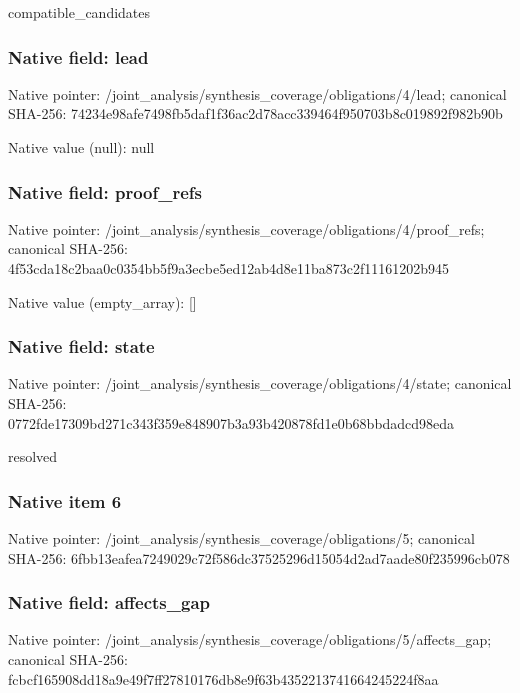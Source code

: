 \documentclass[10pt,a4paper]{article}
\begin{document}
\begingroup\raggedright\sloppy compatible\_\allowbreak{}candidates\par\endgroup

\subsubsection{Native field: lead}
Native pointer: /joint\_\allowbreak{}analysis/synthesis\_\allowbreak{}coverage/obligations/4/lead; canonical SHA-256: 74234e98afe7498fb5daf1f36ac2d78acc339464f950703b8c019892f982b90b

Native value (null): null

\subsubsection{Native field: proof\_\allowbreak{}refs}
Native pointer: /joint\_\allowbreak{}analysis/synthesis\_\allowbreak{}coverage/obligations/4/proof\_\allowbreak{}refs; canonical SHA-256: 4f53cda18c2baa0c0354bb5f9a3ecbe5ed12ab4d8e11ba873c2f11161202b945

Native value (empty\_\allowbreak{}array): []

\subsubsection{Native field: state}
Native pointer: /joint\_\allowbreak{}analysis/synthesis\_\allowbreak{}coverage/obligations/4/state; canonical SHA-256: 0772fde17309bd271c343f359e848907b3a93b420878fd1e0b68bbdadcd98eda

\begingroup\raggedright\sloppy resolved\par\endgroup

\subsubsection{Native item 6}
Native pointer: /joint\_\allowbreak{}analysis/synthesis\_\allowbreak{}coverage/obligations/5; canonical SHA-256: 6fbb13eafea7249029c72f586dc37525296d15054d2ad7aade80f235996cb078

\subsubsection{Native field: affects\_\allowbreak{}gap}
Native pointer: /joint\_\allowbreak{}analysis/synthesis\_\allowbreak{}coverage/obligations/5/affects\_\allowbreak{}gap; canonical SHA-256: fcbcf165908dd18a9e49f7ff27810176db8e9f63b4352213741664245224f8aa
\end{document}
